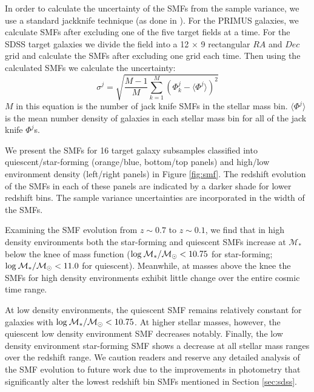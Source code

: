 \documentclass{emulateapj}
\begin{document}
In order to calculate the uncertainty of the SMFs from the sample variance, we use a standard jackknife technique (as done in \cite{Moustakas:2013aa}). For the PRIMUS galaxies, we calculate SMFs after excluding one of the five target fields at a time. For the SDSS target galaxies we divide the field into a 12 $\times$ 9 rectangular $RA$ and $Dec$ grid and calculate the SMFs after excluding one grid each time. Then using the calculated SMFs we calculate the uncertainty: 
\begin{equation}
\sigma^j = \sqrt{\frac{M-1}{M} \sum\limits_{k=1}^{M} (\Phi^j_k - \langle \Phi^j \rangle)^2}
\end{equation} 
$M$ in this equation is the number of jack knife SMFs in the stellar mass bin. $\langle \Phi^j \rangle$ is the mean number density of galaxies 
in each stellar mass bin for all of the jack knife $\Phi^j$s. 

We present the SMFs for 16 target galaxy subsamples classified into quiescent/star-forming (orange/blue, bottom/top panels) and high/low environment density (left/right panels) in Figure \ref{fig:smf}. The redshift evolution of the SMFs in each of these panels are indicated by a darker shade for lower redshift bins. The sample variance uncertainties are incorporated in the width of the SMFs. 

Examining the SMF evolution from $z \sim 0.7$ to $z \sim 0.1$, we find that in high density environments both the star-forming and quiescent SMFs increase at $\mathcal{M}_{*}$ below the knee of mass function ($\rm{log}\: \mathcal{M}_{*}/\mathcal{M}_{\odot} < 10.75$ for star-forming; $\rm{log}\: \mathcal{M}_{*}/\mathcal{M}_{\odot} < 11.0$ for quiescent). Meanwhile, at masses above the knee the SMFs for high density environments exhibit little change over the entire cosmic time range.

At low density environments, the quiescent SMF remains relatively constant for galaxies with $\rm{log}\: \mathcal{M}_{*}/\mathcal{M}_{\odot} < 10.75$. At higher stellar masses, however, the quiescent low density environment SMF decreases notably. Finally, the low density environment star-forming SMF shows a decrease at all stellar mass ranges over the redshift range. We caution readers and reserve any detailed analysis of the SMF evolution to future work due to the improvements in photometry that significantly alter the lowest redshift bin SMFs mentioned in Section \ref{sec:sdss}. 

\end{document}
